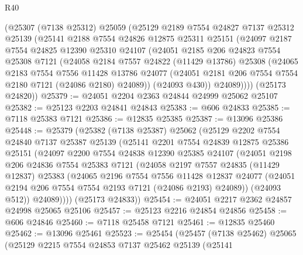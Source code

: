 \begin{lexlean}{R40}
\begin{coremodule}
    (@25307
      (@7138 @25312)
      @25059
      (@25129
        @2189
        @7554
        @24827
        @7137
        @25312
        @25139
        (@25141
          @2188
          @7554
          @24826
          @12875
          @25311
          @25151
          (@24097
            @2187
            @7554
            @24825
            @12390
            @25310
            @24107
            (@24051
              @2185
              @206
              @24823
              @7554
              @25308
              @7121
              (@24058
                @2184
                @7557
                @24822
                (@11429 @13786)
                @25308
                (@24065
                  @2183
                  @7554
                  @7556
                  @11428
                  @13786
                  @24077
                  (@24051 @2181 @206 @7554 @7554 @2180 @7121 (@24086 @2180) @24089))
                (@24093 @430))
              @24089))))
      (@25173 @24820))
@25379 := @24051 @2204 @2363 @24844 @24999 @25062 @25107
@25382 := @25123 @2203 @24841 @24843
@25383 := @606 @24833
@25385 := @7118 @25383 @7121
@25386 := @12835 @25385
@25387 := @13096 @25386
@25448 := @25379
    (@25382
      (@7138 @25387)
      @25062
      (@25129
        @2202
        @7554
        @24840
        @7137
        @25387
        @25139
        (@25141
          @2201
          @7554
          @24839
          @12875
          @25386
          @25151
          (@24097
            @2200
            @7554
            @24838
            @12390
            @25385
            @24107
            (@24051
              @2198
              @206
              @24836
              @7554
              @25383
              @7121
              (@24058
                @2197
                @7557
                @24835
                (@11429 @12837)
                @25383
                (@24065
                  @2196
                  @7554
                  @7556
                  @11428
                  @12837
                  @24077
                  (@24051 @2194 @206 @7554 @7554 @2193 @7121 (@24086 @2193) @24089))
                (@24093 @512))
              @24089))))
      (@25173 @24833))
@25454 := @24051 @2217 @2362 @24857 @24998 @25065 @25106
@25457 := @25123 @2216 @24854 @24856
@25458 := @606 @24846
@25460 := @7118 @25458 @7121
@25461 := @12835 @25460
@25462 := @13096 @25461
@25523 := @25454
    (@25457
      (@7138 @25462)
      @25065
      (@25129
        @2215
        @7554
        @24853
        @7137
        @25462
        @25139
        (@25141

\end{coremodule}
\end{lexlean}

